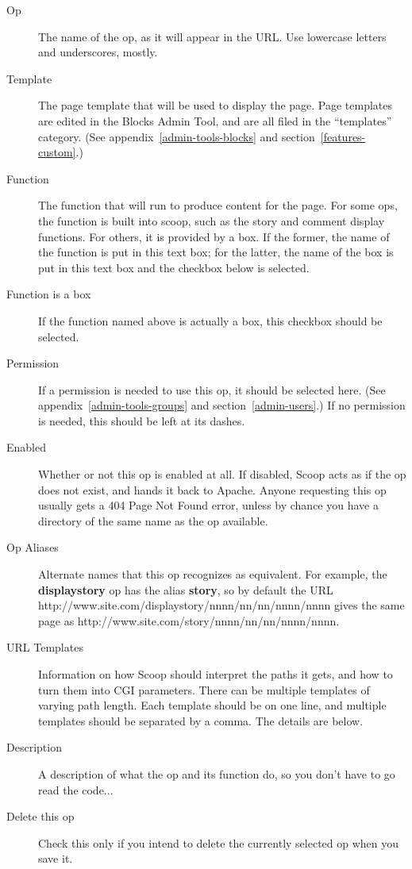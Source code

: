 \begin{description}
\item[Op] The name of the op, as it will appear in the URL.  Use lowercase letters and underscores, mostly.
\item[Template] The page template that will be used to display the page.  Page templates are edited in the Blocks Admin Tool, and are all filed in the ``templates'' category.  (See appendix~\ref{admin-tools-blocks} and section~\ref{features-custom}.)
\item[Function] The function that will run to produce content for the page.  For some ops, the function is built into scoop, such as the story and comment display functions.  For others, it is provided by a box.  If the former, the name of the function is put in this text box; for the latter, the name of the box is put in this text box and the checkbox below is selected.
\item[Function is a box] If the function named above is actually a box, this checkbox should be selected.
\item[Permission] If a permission is needed to use this op, it should be selected here.  (See appendix~\ref{admin-tools-groups} and section~\ref{admin-users}.)  If no permission is needed, this should be left at its dashes.
\item[Enabled] Whether or not this op is enabled at all.  If disabled, Scoop acts as if the op does not exist, and hands it back to Apache.  Anyone requesting this op usually gets a 404 Page Not Found error, unless by chance you have a directory of the same name as the op available.
\item[Op Aliases] Alternate names that this op recognizes as equivalent. For example, the {\bf displaystory} op has the alias {\bf story}, so by default the URL http://www.site.com/displaystory/nnnn/nn/nn/nnnn/nnnn gives the same page as http://www.site.com/story/nnnn/nn/nn/nnnn/nnnn.
\item[URL Templates] Information on how Scoop should interpret the paths it gets, and how to turn them into CGI parameters. There can be multiple templates of varying path length. Each template should be on one line, and multiple templates should be separated by a comma. The details are below.
\item[Description] A description of what the op and its function do, so you don't have to go read the code...
\item[Delete this op] Check this only if you intend to delete the currently selected op when you save it.
\end{description}

